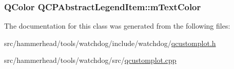 \subsubsection[{\texorpdfstring{m\+Text\+Color}{mTextColor}}]{\setlength{\rightskip}{0pt plus 5cm}Q\+Color Q\+C\+P\+Abstract\+Legend\+Item\+::m\+Text\+Color\hspace{0.3cm}{\ttfamily [protected]}}\hypertarget{classQCPAbstractLegendItem_a974b21e9930227d281344bd2242d289d}{}\label{classQCPAbstractLegendItem_a974b21e9930227d281344bd2242d289d}


The documentation for this class was generated from the following files\+:\begin{DoxyCompactItemize}
\item 
src/hammerhead/tools/watchdog/include/watchdog/\hyperlink{qcustomplot_8h}{qcustomplot.\+h}\item 
src/hammerhead/tools/watchdog/src/\hyperlink{qcustomplot_8cpp}{qcustomplot.\+cpp}\end{DoxyCompactItemize}

